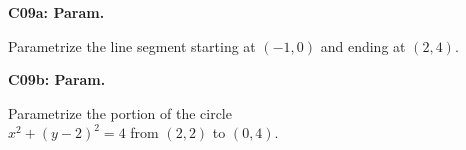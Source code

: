 \documentclass[12pt]{article}
\newcommand{\<}{\left\langle}
\renewcommand{\>}{\right\rangle}
\newcommand{\exerciseHeader}[4]{


  \vspace{0.5em}
  \textbf{#2}
  \vspace{0.5em}

}
\begin{document}
\begin{multicols}{2}
%

%

%

\exerciseHeader{2017 June 30}{C09a: Param.}{
Parametrize planar curves and sketch parametrized curves.
}{3/4}

Parametrize the line segment starting at \((-1,0)\) and ending at \((2,4)\).

\exerciseHeader{2017 June 30}{C09b: Param.}{
Parametrize planar curves and sketch parametrized curves.
}{3/4}

Parametrize the portion of the circle\\ \(x^2+(y-2)^2=4\) from \((2,2)\) to
\((0,4)\).



%

%

%


\end{multicols}
\end{document}
